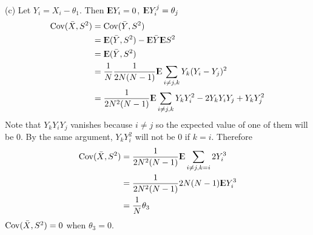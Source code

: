 \documentclass[12pt]{article}
\begin{document}
(c)
 Let $Y_i = X_i - \theta_1$. Then ${\rm I\kern-.3em E} Y_i = 0$, ${\rm I\kern-.3em E} Y_i^j = \theta_j$
 $$\begin{aligned}
	\mathrm{Cov}(\bar{X}, S^2) &= \mathrm{Cov}(\bar{Y}, S^2) \\
	 &= {\rm I\kern-.3em E}(\bar{Y}, S^2) - {\rm I\kern-.3em E} \bar{Y} {\rm I\kern-.3em E} S^2 \\
	 &= {\rm I\kern-.3em E}(\bar{Y}, S^2) \\
	 &= \frac{1}{N} \frac{1}{2N(N-1)} {\rm I\kern-.3em E} \sum_{i\neq j, k} Y_k (Y_i - Y_j)^2 \\
	 &= \frac{1}{2N^2(N-1)} {\rm I\kern-.3em E} \sum_{i\neq j, k} Y_kY_i^2 - 2Y_k Y_iY_j + Y_k Y_j^2 \\
\end{aligned}$$
Note that $Y_k Y_iY_j$ vanishes because $i \neq j$ so the expected value of one of them will be 0. By the same argument,  $Y_kY_i^2$ will not be 0 if $k=i$. Therefore 
 $$\begin{aligned}
	\mathrm{Cov}(\bar{X}, S^2) &=\frac{1}{2N^2(N-1)} {\rm I\kern-.3em E} \sum_{i\neq j, k=i} 2 Y_i^3 \\
	&= \frac{1}{2N^2(N-1)} 2N(N-1) {\rm I\kern-.3em E} Y_i^3 \\
	&= \frac{1}{N } \theta_3 \\
\end{aligned}$$
$\mathrm{Cov}(\bar{X}, S^2) = 0 $ when $\theta_3 = 0$.
\QED
\end{document}

